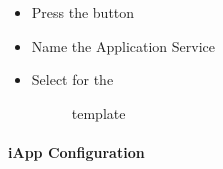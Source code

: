 \documentclass[letterpaper,10pt,english]{sphinxmanual}
\begin{document}
\begin{enumerate}
\begin{itemize}
\item {} 
Press the  button

\item {} 
Name the Application Service 

\item {} \begin{description}
\item[{Select  for the}] \leavevmode
template

\end{description}

\end{itemize}

\end{enumerate}


\paragraph{iApp Configuration}
\end{document}
